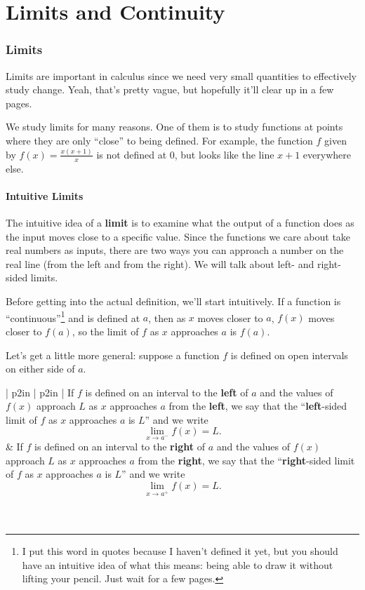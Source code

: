 \documentclass{article}
\theoremstyle{definition}
\theoremstyle{definition}
\begin{document}
\newpage
\part{Limits and Continuity}

\section{Limits}

Limits are important in calculus since we need very small quantities to effectively study change. Yeah, that's pretty vague, but hopefully it'll clear up in a few pages.

We study limits for many reasons. One of them is to study functions at points where they are only ``close'' to being defined. For example, the function $f$ given by $f(x)=\frac{x(x+1)}{x}$ is not defined at $0$, but looks like the line $x+1$ everywhere else.

\subsection{Intuitive Limits}

The intuitive idea of a \textbf{limit} is to examine what the output of a function does as the input moves close to a specific value. Since the functions we care about take real numbers as inputs, there are two ways you can approach a number on the real line (from the left and from the right). We will talk about left- and right-sided limits.

Before getting into the actual definition, we'll start intuitively. If a function is     ``continuous''\footnote{I put this word in quotes because I haven't defined it yet, but you should have an intuitive idea of what this means: being able to draw it without lifting your pencil. Just wait for a few pages.} and is defined at $a$, then as $x$ moves closer to $a$, $f(x)$ moves closer to $f(a)$, so the limit of $f$ as $x$ approaches $a$ is $f(a)$.


Let's get a little more general: suppose a function $f$ is defined on open intervals on either side of $a$.

\begin{center}
\def\arraystretch{1.3}
\begin{tabular}{| p{2in} | p{2in} |} \hline
If $f$ is defined on an interval to the \textbf{left} of $a$ and the values of $f(x)$ approach $L$ as $x$ approaches $a$ from the \textbf{left}, we say that the ``\textbf{left}-sided limit of $f$ as $x$ approaches $a$ is $L$'' and we write $$\lim_{x\to a^-}f(x)=L.$$ & If $f$ is defined on an interval to the \textbf{right} of $a$ and the values of $f(x)$ approach $L$ as $x$ approaches $a$ from the \textbf{right}, we say that the ``\textbf{right}-sided limit of $f$ as $x$ approaches $a$ is $L$'' and we write
$$\lim_{x\to a^+}f(x)=L.$$
\\\hline
{} \\\hline
\end{tabular}
\end{center}
\end{document}
